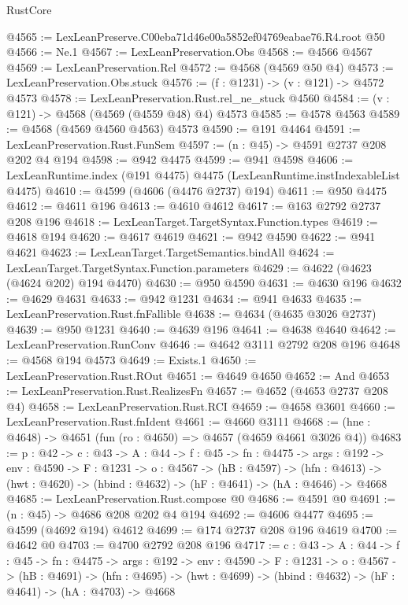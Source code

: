 \begin{lexlean}{RustCore}
\begin{coremodule}
@4565 := LexLeanPreserve.C00eba71d46e00a5852ef04769eabae76.R4.root @50
@4566 := Ne.{1}
@4567 := LexLeanPreservation.Obs
@4568 := @4566 @4567
@4569 := LexLeanPreservation.Rel
@4572 := @4568 (@4569 @50 @4)
@4573 := LexLeanPreservation.Obs.stuck
@4576 := (f : @1231) -> (v : @121) -> @4572 @4573
@4578 := LexLeanPreservation.Rust.rel_ne_stuck @4560
@4584 := (v : @121) -> @4568 (@4569 (@4559 @48) @4) @4573
@4585 := @4578 @4563
@4589 := @4568 (@4569 @4560 @4563) @4573
@4590 := @191 @4464
@4591 := LexLeanPreservation.Rust.FunSem
@4597 := (n : @45) -> @4591 @2737 @208 @202 @4 @194
@4598 := @942 @4475
@4599 := @941 @4598
@4606 := LexLeanRuntime.index (@191 @4475) @4475 (LexLeanRuntime.instIndexableList @4475)
@4610 := @4599 (@4606 (@4476 @2737) @194)
@4611 := @950 @4475
@4612 := @4611 @196
@4613 := @4610 @4612
@4617 := @163 @2792 @2737 @208 @196
@4618 := LexLeanTarget.TargetSyntax.Function.types
@4619 := @4618 @194
@4620 := @4617 @4619
@4621 := @942 @4590
@4622 := @941 @4621
@4623 := LexLeanTarget.TargetSemantics.bindAll
@4624 := LexLeanTarget.TargetSyntax.Function.parameters
@4629 := @4622 (@4623 (@4624 @202) @194 @4470)
@4630 := @950 @4590
@4631 := @4630 @196
@4632 := @4629 @4631
@4633 := @942 @1231
@4634 := @941 @4633
@4635 := LexLeanPreservation.Rust.fnFallible
@4638 := @4634 (@4635 @3026 @2737)
@4639 := @950 @1231
@4640 := @4639 @196
@4641 := @4638 @4640
@4642 := LexLeanPreservation.RunConv
@4646 := @4642 @3111 @2792 @208 @196
@4648 := @4568 @194 @4573
@4649 := Exists.{1}
@4650 := LexLeanPreservation.Rust.ROut
@4651 := @4649 @4650
@4652 := And
@4653 := LexLeanPreservation.Rust.RealizesFn
@4657 := @4652 (@4653 @2737 @208 @4)
@4658 := LexLeanPreservation.Rust.RCI
@4659 := @4658 @3601
@4660 := LexLeanPreservation.Rust.fnIdent
@4661 := @4660 @3111
@4668 := (hne : @4648) -> @4651 (fun (ro : @4650) => @4657 (@4659 @4661 @3026 @4))
@4683 := {p : @42} ->
  {c : @43} ->
  {A : @44} ->
  {f : @45} ->
  {fn : @4475} ->
  {args : @192} ->
  {env : @4590} ->
  {F : @1231} ->
  {o : @4567} ->
  (hB : @4597) ->
  (hfn : @4613) -> (hwt : @4620) -> (hbind : @4632) -> (hF : @4641) -> (hA : @4646) -> @4668
@4685 := LexLeanPreservation.Rust.compose @0
@4686 := @4591 @0
@4691 := (n : @45) -> @4686 @208 @202 @4 @194
@4692 := @4606 @4477
@4695 := @4599 (@4692 @194) @4612
@4699 := @174 @2737 @208 @196 @4619
@4700 := @4642 @0
@4703 := @4700 @2792 @208 @196
@4717 := {c : @43} ->
  {A : @44} ->
  {f : @45} ->
  {fn : @4475} ->
  {args : @192} ->
  {env : @4590} ->
  {F : @1231} ->
  {o : @4567} ->
  (hB : @4691) ->
  (hfn : @4695) -> (hwt : @4699) -> (hbind : @4632) -> (hF : @4641) -> (hA : @4703) -> @4668

\end{coremodule}
\end{lexlean}

